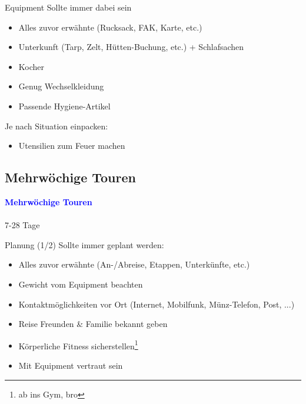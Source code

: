 \documentclass[aspectratio=169]{beamer}
\begin{document}
			\begin{frame}{Equipment}
				Sollte immer dabei sein
				\begin{itemize}
					\item Alles zuvor erwähnte (Rucksack, FAK, Karte, etc.)
					\item Unterkunft (Tarp, Zelt, Hütten-Buchung, etc.) + Schlafsachen
					\item Kocher
					\item Genug Wechselkleidung
					\item Passende Hygiene-Artikel
				\end{itemize}
				Je nach Situation einpacken:
				\begin{itemize}
					\item Utensilien zum Feuer machen
				\end{itemize}
			\end{frame}
		
		\subsection{Mehrwöchige Touren}
		
			\begin{frame}
				\vspace{1cm}
				\begin{center}
					\textcolor{blue}{\textbf{Mehrwöchige Touren}}
					\\\,\\
					{\scriptsize 7-28 Tage}
				\end{center}
			\end{frame}
		
			\begin{frame}{Planung (1/2)}
				Sollte immer geplant werden:
				\begin{itemize}
					\item Alles zuvor erwähnte (An-/Abreise, Etappen, Unterkünfte, etc.)
					\item Gewicht vom Equipment beachten
					\item Kontaktmöglichkeiten vor Ort (Internet, Mobilfunk, Münz-Telefon, Post, ...)
					\item Reise Freunden \& Familie bekannt geben
					\item Körperliche Fitness sicherstellen\footnote{ab ins Gym, bro}
					\item Mit Equipment vertraut sein
				\end{itemize}
			\end{frame}
				
\end{document}
